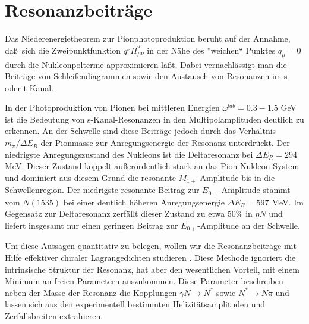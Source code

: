 \section{Resonanzbeitr\"age}
Das Niederenergietheorem zur Pionphotoproduktion beruht auf der
Annahme, da\ss\ sich die Zweipunktfunktion $q^\nu\overline\Pi^a_{\mu\nu}$
in der N\"ahe des ''weichen`` Punktes $q_\mu=0$ durch die Nukleonpolterme
approximieren l\"a\ss t. Dabei vernachl\"assigt man  die Beitr\"age
von Schleifendiagrammen sowie den Austausch von Resonanzen im s- oder
t-Kanal. 

In der Photoproduktion von Pionen bei mittleren Energien 
$\omega^{lab}= 0.3-1.5$ GeV ist die Bedeutung von s-Kanal-Resonanzen
in den Multipolamplituden deutlich zu erkennen. 
An der Schwelle sind diese Beitr\"age jedoch durch das
Verh\"altnis $m_\pi/\Delta E_R$ der Pionmasse zur Anregungsenergie
der Resonanz unterdr\"uckt. Der niedrigste Anregungszustand des
Nukleons ist die Deltaresonanz bei $\Delta E_R =294$ MeV. Dieser
Zustand koppelt au\ss erordentlich stark an das Pion-Nukleon-System
und dominiert aus diesem Grund die resonante $M_{1+}$-Amplitude
bis in die Schwellenregion. Der niedrigste resonante Beitrag zur
$E_{0+}$-Amplitude stammt vom $N(1535)$ bei einer deutlich h\"oheren
Anregungsenergie $\Delta E_R= 597$ MeV. Im Gegensatz zur Deltaresonanz
zerf\"allt dieser Zustand zu etwa 50\% in $\eta N$ und liefert 
insgesamt nur einen geringen Beitrag zur $E_{0+}$-Amplitude
an der Schwelle.

Um diese Aussagen quantitativ zu belegen, wollen wir die 
Resonanzbeitr\"age mit Hilfe effektiver chiraler Lagrangedichten studieren 
\cite{Pec69,OO75,NB80}. Diese Methode ignoriert die intrinsische 
Struktur der Resonanz, hat aber den wesentlichen Vorteil, mit einem
Minimum an freien Parametern auszukommen. Diese Parameter beschreiben
neben der Masse der Resonanz die Kopplungen $\gamma N\to N^{*}$ 
sowie $N^{*}\to N\pi$ und lassen sich aus den experimentell bestimmten
Helizit\"atsamplituden und Zerfallsbreiten extrahieren.

